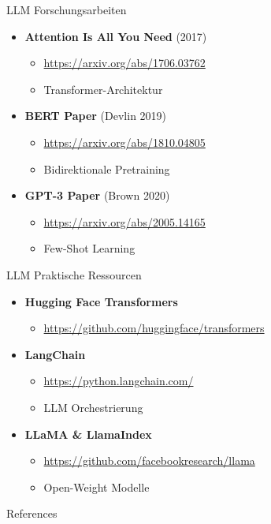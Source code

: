 \documentclass[aspectratio=1610, xcolor=dvipsnames, 9pt]{beamer}
\begin{document}
\begin{frame}{LLM Forschungsarbeiten}
\begin{itemize}
\item \textbf{Attention Is All You Need} (2017)
\begin{itemize}
\item \url{https://arxiv.org/abs/1706.03762}
\item Transformer-Architektur
\end{itemize}

\item \textbf{BERT Paper} (Devlin 2019)
\begin{itemize}
\item \url{https://arxiv.org/abs/1810.04805}
\item Bidirektionale Pretraining
\end{itemize}

\item \textbf{GPT-3 Paper} (Brown 2020)
\begin{itemize}
\item \url{https://arxiv.org/abs/2005.14165}
\item Few-Shot Learning
\end{itemize}
\end{itemize}
\end{frame}

\begin{frame}{LLM Praktische Ressourcen}
\begin{itemize}
\item \textbf{Hugging Face Transformers}
\begin{itemize}
\item \url{https://github.com/huggingface/transformers}
\end{itemize}

\item \textbf{LangChain}
\begin{itemize}
\item \url{https://python.langchain.com/}
\item LLM Orchestrierung
\end{itemize}

\item \textbf{LLaMA \& LlamaIndex}
\begin{itemize}
\item \url{https://github.com/facebookresearch/llama}
\item Open-Weight Modelle
\end{itemize}
\end{itemize}
\end{frame}
\begin{frame}[allowframebreaks]{References}
 
 
\end{frame}
\end{document}
